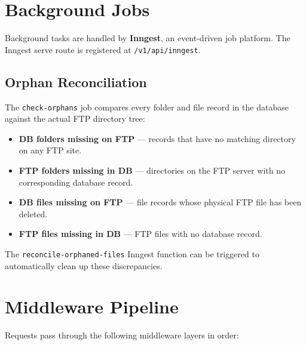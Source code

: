 \documentclass[12pt,a4paper]{article}
\begin{document}
\newpage

\section{Background Jobs}

Background tasks are handled by \textbf{Inngest}, an event-driven job platform. The Inngest serve route is registered at \texttt{/v1/api/inngest}.

\subsection{Orphan Reconciliation}

The \texttt{check-orphans} job compares every folder and file record in the database against the actual FTP directory tree:

\begin{itemize}
  \item \textbf{DB folders missing on FTP} — records that have no matching directory on any FTP site.
  \item \textbf{FTP folders missing in DB} — directories on the FTP server with no corresponding database record.
  \item \textbf{DB files missing on FTP} — file records whose physical FTP file has been deleted.
  \item \textbf{FTP files missing in DB} — FTP files with no database record.
\end{itemize}

The \texttt{reconcile-orphaned-files} Inngest function can be triggered to automatically clean up these discrepancies.

\newpage

\section{Middleware Pipeline}

Requests pass through the following middleware layers in order:
\end{document}
